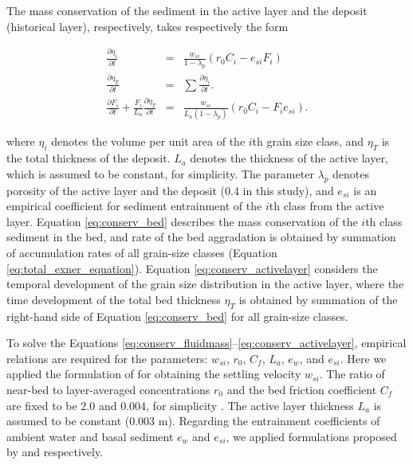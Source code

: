 The mass conservation of the sediment in the active layer and the deposit (historical layer), respectively, takes respectively the form

\begin{eqnarray}
  \frac{\partial \eta_i}{\partial t} & = & \frac{w_{si}}{1-\lambda_p}(r_0 C_i - e_{si} F_i) \label{eq:conserv_bed} \\
\frac{\partial \eta_T}{\partial t} &=& \sum \frac{\partial \eta_i}{\partial t}.
\label{eq:total_exner_equation} \\
\frac{\partial F_i}{\partial t} + \frac{F_i}{L_a}\frac{\partial \eta_T}{\partial t} & = & \frac{w_{si}}{L_a (1 - \lambda_p)}(r_0 C_i - F_i e_{si} ). \label{eq:conserv_activelayer}
\end{eqnarray}

\noindent where $\eta_i$ denotes the volume per unit area of the $i$th grain size class, and $\eta_T$ is the total thickness of the deposit. $L_a$ denotes the thickness of the active layer, which is assumed to be constant, for simplicity. The parameter $\lambda_p$ denotes porosity of the active layer and the deposit (0.4 in this study), and $e_{si}$ is an empirical coefficient for sediment entrainment of the $i$th class from the active layer. Equation \ref{eq:conserv_bed} describes the mass conservation of the $i$th class sediment in the bed, and rate of the bed aggradation is obtained by summation of accumulation rates of all grain-size classes (Equation \ref{eq:total_exner_equation}). Equation \ref{eq:conserv_activelayer} considers the temporal development of the grain size distribution in the active layer, where the time development of the total bed thickness $\eta_T$ is obtained by summation of the right-hand side of Equation \ref{eq:conserv_bed} for all grain-size classes.

To solve the Equations \ref{eq:conserv_fluidmass}--\ref{eq:conserv_activelayer}, empirical relations are required for the parameters: $w_{si}$, $r_0$, $C_f$, $L_a$, $e_w$, and $e_{si}$. Here we applied the formulation of \citet{dietrich1982settling} for obtaining the settling velocity $w_{si}$. The ratio of near-bed to layer-averaged concentrations $r_0$ and the bed friction coefficient $C_f$ are fixed to be 2.0 and 0.004, for simplicity \citep{Garcia1990}. The active layer thickness $L_a$ is assumed to be constant (0.003 m). Regarding the entrainment coefficients of ambient water and basal sediment $e_w$ and $e_{si}$, we applied formulations proposed by \citet{parker1987experiments} and \citet{garcia1991entrainment} respectively.

